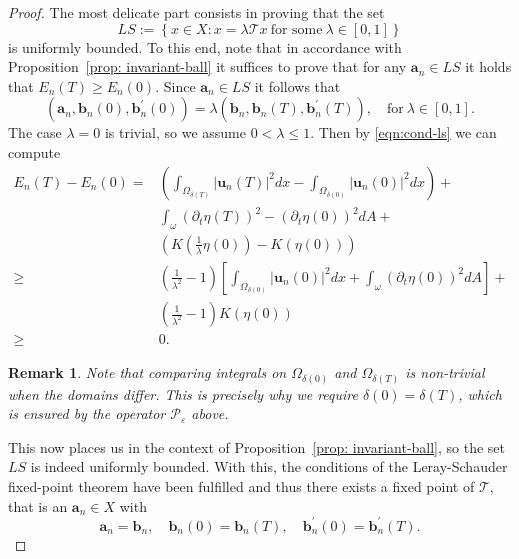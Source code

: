 \documentclass[10pt,a4paper]{amsart}
\newtheorem{remark}{Remark}
\begin{document}
\begin{proof}
The most delicate part consists in proving that the set 
\[LS:=\left\{ x\in X:x=\lambda\mathcal{T}x\ \text{for some}\ \lambda\in\left[0,1\right]\right\} 
\] is uniformly bounded. 
To this end, note that in accordance with Proposition~\ref{prop: invariant-ball} it suffices to prove that for any $\mathbf{a}_{n}\in LS$ it holds that $E_{n}\left(T\right)\ge E_{n}\left(0\right)$. 
Since $\mathbf{a}_{n} \in LS$ it follows that 
\begin{equation}\label{eqn:cond-ls}
\left(\mathbf{a}_{n},\mathbf{b}_{n}\left(0\right),\mathbf{b}_{n}^{\prime}\left(0\right)\right)=\lambda\left(\mathbf{b}_{n},\mathbf{b}_{n}\left(T\right),\mathbf{b}_{n}^{\prime}\left(T\right)\right),\quad\text{for}\ \lambda\in\left[0,1\right].
\end{equation}
The case $\lambda=0$ is trivial, so we assume $0<\lambda \le 1$.
Then by  \eqref{eqn:cond-ls} we can compute
\begin{equation}\begin{aligned}E_{n}\left(T\right)-E_{n}\left(0\right)= & \left(\int_{\Omega_{\delta\left(T\right)}}\left|\mathbf{u}_{n}\left(T\right)\right|^{2}dx-\int_{\Omega_{\delta\left(0\right)}}\left|\mathbf{u}_{n}\left(0\right)\right|^{2}dx\right)+\\
 & \int_{\omega}\left(\partial_{t}\eta\left(T\right)\right)^{2}-\left(\partial_{t}\eta\left(0\right)\right)^{2}dA+\\
 & \left(K\left(\frac{1}{\lambda}\eta\left(0\right)\right)-K\left(\eta\left(0\right)\right)\right)\\
\ge & \left(\frac{1}{\lambda^{2}}-1\right)\left[\int_{\Omega_{\delta\left(0\right)}}\left|\mathbf{u}_{n}\left(0\right)\right|^{2}dx+\int_{\omega}\left(\partial_{t}\eta\left(0\right)\right)^{2}dA\right]+\\
 & \left(\frac{1}{\lambda^{2}}-1\right)K\left(\eta\left(0\right)\right)\\
\ge & 0.
\end{aligned}
\end{equation}

\begin{remark}
Note that comparing integrals on $\Omega_{\delta(0)}$ and $\Omega_{\delta(T)}$ is non-trivial when the domains differ. This is precisely why we require $\delta(0)=\delta(T)$, which is ensured by the operator $\mathcal{P}_{\varepsilon}$ above.
\end{remark}

This now places us in the context of Proposition~\ref{prop: invariant-ball}, so the set $LS$ is indeed uniformly bounded. With this, the conditions of the Leray-Schauder fixed-point theorem have been fulfilled and thus there exists a  fixed point of $\mathcal{T}$, that is an $\mathbf{a}_{n} \in X$ with 
\[\mathbf{a}_{n}=\mathbf{b}_{n},\quad\mathbf{b}_{n}\left(0\right)=\mathbf{b}_{n}\left(T\right),\quad\mathbf{b}_{n}^{\prime}\left(0\right)=\mathbf{b}_{n}^{\prime}\left(T\right).\]
\end{proof}
\end{document}
